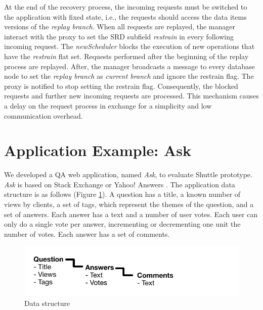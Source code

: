 At the end of the recovery process, the incoming requests must be switched to the application with fixed state, i.e., the requests should access the data items versions of the \emph{replay branch}. When all requests are replayed, the manager interact with the proxy to set the \ac{SRD} subfield \emph{restrain} in every following incoming request. The \emph{newScheduler} blocks the execution of new operations that have the \emph{restrain} flat set. Requests performed after the beginning of the replay process are replayed. After, the manager broadcasts a message to every database node to set the \emph{replay branch} as \emph{current branch} and ignore the restrain flag. The proxy is notified to stop setting the restrain flag. Consequently, the blocked requests and further new incoming requests are processed. This mechanism causes a delay on the request process in exchange for a simplicity and low communication overhead. 

\section{Application Example: Ask}\label{sec:impl:application}
We developed a \acf{QA} web application, named \emph{Ask}, to evaluate Shuttle prototype. \emph{Ask} is based on Stack Exchange \cite{stackexchange} or Yahoo! Answers \cite{yahooAnswers}. The application data structure is as follows (Figure \ref{fig:DataStructure}). A question has a title, a known number of views by clients, a set of tags, which represent the themes of the question, and a set of answers. Each answer has a text and a number of user votes. Each user can only do a single vote per answer, incrementing or decrementing one unit the number of votes. Each answer has a set of comments.

 \begin{figure}
   \centering
   \includegraphics{images/questionStructure}
   \caption{Data structure}
   \label{fig:DataStructure}
 \end{figure}

